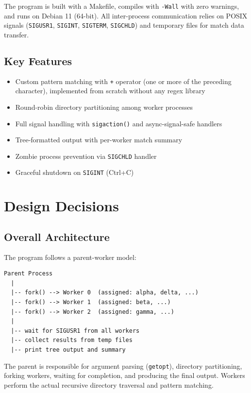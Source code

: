 \documentclass[12pt,a4paper]{article}
\begin{document}
The program is built with a Makefile, compiles with \texttt{-Wall} with zero warnings, and runs on Debian 11 (64-bit). All inter-process communication relies on POSIX signals (\texttt{SIGUSR1}, \texttt{SIGINT}, \texttt{SIGTERM}, \texttt{SIGCHLD}) and temporary files for match data transfer.

\subsection{Key Features}

\begin{itemize}[noitemsep]
    \item Custom pattern matching with \texttt{+} operator (one or more of the preceding character), implemented from scratch without any regex library
    \item Round-robin directory partitioning among worker processes
    \item Full signal handling with \texttt{sigaction()} and async-signal-safe handlers
    \item Tree-formatted output with per-worker match summary
    \item Zombie process prevention via \texttt{SIGCHLD} handler
    \item Graceful shutdown on \texttt{SIGINT} (Ctrl+C)
\end{itemize}

\section{Design Decisions}

\subsection{Overall Architecture}

The program follows a parent-worker model:

\begin{lstlisting}
Parent Process
  |
  |-- fork() --> Worker 0  (assigned: alpha, delta, ...)
  |-- fork() --> Worker 1  (assigned: beta, ...)
  |-- fork() --> Worker 2  (assigned: gamma, ...)
  |
  |-- wait for SIGUSR1 from all workers
  |-- collect results from temp files
  |-- print tree output and summary
\end{lstlisting}

The parent is responsible for argument parsing (\texttt{getopt}), directory partitioning, forking workers, waiting for completion, and producing the final output. Workers perform the actual recursive directory traversal and pattern matching.
\end{document}
